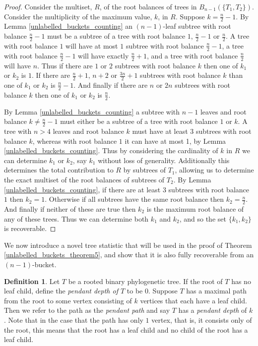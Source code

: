 \documentclass[12pt]{article}
\theoremstyle{definition}
\newtheorem{Definition}[Theorem]{Definition}
\begin{document}
\begin{proof}
    Consider the multiset, $R$, of the root balances of trees in $B_{n-1}(\{T_1, T_2\})$. Consider the multiplicity of the maximum value, $k$, in $R$. Suppose $k = \frac{n}{2}-1$. By Lemma \ref{unlabelled_buckets_counting} an $(n-1)$-leaf subtree with root balance $\frac{n}{2}-1$ must be a subtree of a tree with root balance $1$, $\frac{n}{2}-1$ or $\frac{n}{2}$. A tree with root balance $1$ will have at most $1$ subtree with root balance $\frac{n}{2}-1$, a tree with root balance $\frac{n}{2}-1$ will have exactly $\frac{n}{2}+1$, and a tree with root balance $\frac{n}{2}$ will have $n$. Thus if there are $1$ or $2$ subtrees with root balance $k$ then one of $k_1$ or $k_2$ is $1$. If there are $\frac{n}{2}+1$, $n+2$ or $\frac{3n}{2}+1$ subtrees with root balance $k$ than one of $k_1$ or $k_2$ is $\frac{n}{2}-1$. And finally if there are $n$ or $2n$ subtrees with root balance $k$ then one of $k_1$ or $k_2$ is $\frac{n}{2}$.
    
    By Lemma \ref{unlabelled_buckets_counting} a subtree with $n-1$ leaves and root balance $k \neq \frac{n}{2}-1$ must either be a subtree of a tree with root balance $1$ or $k$. A tree with $n>4$ leaves and root balance $k$ must have at least $3$ subtrees with root balance $k$, whereas with root balance $1$ it can have at most 1, by Lemma \ref{unlabelled_buckets_counting}. Thus by considering the cardinality of $k$ in $R$ we can determine $k_1$ or $k_2$, say $k_1$ without loss of generality. Additionally this determines the total contribution to $R$ by subtrees of $T_1$, allowing us to determine the exact multiset of the root balances of subtrees of $T_2$. By Lemma \ref{unlabelled_buckets_counting}, if there are at least $3$ subtrees with root balance $1$ then $k_2 = 1$. Otherwise if all subtrees have the same root balance then $k_2 = \frac{n}{2}$. And finally if neither of these are true then $k_2$ is the maximum root balance of any of these trees. Thus we can determine both $k_1$ and $k_2$, and so the set $\{k_1, k_2\}$ is recoverable.
\end{proof}

We now introduce a novel tree statistic that will be used in the proof of Theorem \ref{unlabelled_buckets_theorem5}, and show that it is also fully recoverable from an $(n-1)$-bucket.

\begin{Definition}
    Let $T$ be a rooted binary phylogenetic tree. If the root of $T$ has no leaf child, define the \emph{pendant depth of $T$} to be $0$. Suppose $T$ has a maximal path from the root to some vertex consisting of $k$ vertices that each have a leaf child. Then we refer to the path as the \emph{pendant path} and say $T$ has a \emph{pendant depth} of $k$. Note that in the case that the path has only $1$ vertex, that is, it consists only of the root, this means that the root has a leaf child and no child of the root has a leaf child.
\end{Definition}
\end{document}
